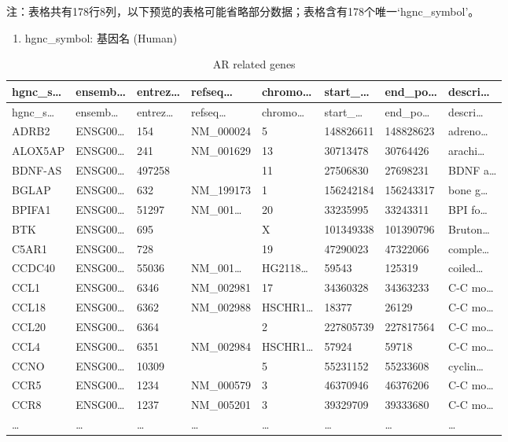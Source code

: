 \documentclass[
]{article}
\providecommand{\tightlist}{%
  \setlength{\itemsep}{0pt}\setlength{\parskip}{0pt}}
\begin{document}
\begin{center}\begin{tcolorbox}[colback=gray!10, colframe=gray!50, width=0.9\linewidth, arc=1mm, boxrule=0.5pt]注：表格共有178行8列，以下预览的表格可能省略部分数据；表格含有178个唯一`hgnc\_symbol'。
\end{tcolorbox}
\end{center}
\begin{center}\begin{tcolorbox}[colback=gray!10, colframe=gray!50, width=0.9\linewidth, arc=1mm, boxrule=0.5pt]\begin{enumerate}\tightlist
\item hgnc\_symbol:  基因名 (Human)
\end{enumerate}\end{tcolorbox}
\end{center}

\begin{longtable}[]{@{}llllllll@{}}
\caption{\label{tab:AR-related-genes}AR related genes}\tabularnewline
\toprule
hgnc\_s\ldots{} & ensemb\ldots{} & entrez\ldots{} & refseq\ldots{} & chromo\ldots{} & start\_\ldots{} & end\_po\ldots{} & descri\ldots{}\tabularnewline
\midrule
\endfirsthead
\toprule
hgnc\_s\ldots{} & ensemb\ldots{} & entrez\ldots{} & refseq\ldots{} & chromo\ldots{} & start\_\ldots{} & end\_po\ldots{} & descri\ldots{}\tabularnewline
\midrule
\endhead
ADRB2 & ENSG00\ldots{} & 154 & NM\_000024 & 5 & 148826611 & 148828623 & adreno\ldots{}\tabularnewline
ALOX5AP & ENSG00\ldots{} & 241 & NM\_001629 & 13 & 30713478 & 30764426 & arachi\ldots{}\tabularnewline
BDNF-AS & ENSG00\ldots{} & 497258 & & 11 & 27506830 & 27698231 & BDNF a\ldots{}\tabularnewline
BGLAP & ENSG00\ldots{} & 632 & NM\_199173 & 1 & 156242184 & 156243317 & bone g\ldots{}\tabularnewline
BPIFA1 & ENSG00\ldots{} & 51297 & NM\_001\ldots{} & 20 & 33235995 & 33243311 & BPI fo\ldots{}\tabularnewline
BTK & ENSG00\ldots{} & 695 & & X & 101349338 & 101390796 & Bruton\ldots{}\tabularnewline
C5AR1 & ENSG00\ldots{} & 728 & & 19 & 47290023 & 47322066 & comple\ldots{}\tabularnewline
CCDC40 & ENSG00\ldots{} & 55036 & NM\_001\ldots{} & HG2118\ldots{} & 59543 & 125319 & coiled\ldots{}\tabularnewline
CCL1 & ENSG00\ldots{} & 6346 & NM\_002981 & 17 & 34360328 & 34363233 & C-C mo\ldots{}\tabularnewline
CCL18 & ENSG00\ldots{} & 6362 & NM\_002988 & HSCHR1\ldots{} & 18377 & 26129 & C-C mo\ldots{}\tabularnewline
CCL20 & ENSG00\ldots{} & 6364 & & 2 & 227805739 & 227817564 & C-C mo\ldots{}\tabularnewline
CCL4 & ENSG00\ldots{} & 6351 & NM\_002984 & HSCHR1\ldots{} & 57924 & 59718 & C-C mo\ldots{}\tabularnewline
CCNO & ENSG00\ldots{} & 10309 & & 5 & 55231152 & 55233608 & cyclin\ldots{}\tabularnewline
CCR5 & ENSG00\ldots{} & 1234 & NM\_000579 & 3 & 46370946 & 46376206 & C-C mo\ldots{}\tabularnewline
CCR8 & ENSG00\ldots{} & 1237 & NM\_005201 & 3 & 39329709 & 39333680 & C-C mo\ldots{}\tabularnewline
\ldots{} & \ldots{} & \ldots{} & \ldots{} & \ldots{} & \ldots{} & \ldots{} & \ldots{}\tabularnewline
\bottomrule
\end{longtable}
\end{document}
